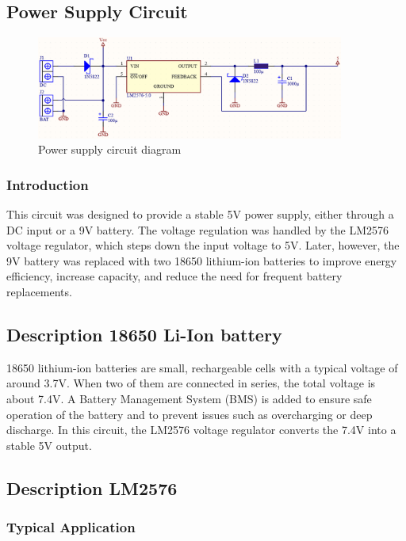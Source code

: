 \subsection{Power Supply Circuit}

\begin{figure}[h]
\centering
\includegraphics[width=0.9\textwidth]{assets/Power Supply}
\caption{Power supply circuit diagram}
\label{fig:power_circuit}
\end{figure}

\subsubsection*{Introduction}
This circuit was designed to provide a stable 5V power supply, either through a DC input or a 9V battery. The voltage regulation was handled by the LM2576 voltage regulator, which steps down the input voltage to 5V. Later, however, the 9V battery was replaced with two 18650 lithium-ion batteries to improve energy efficiency, increase capacity, and reduce the need for frequent battery replacements.

\subsection{Description 18650 Li-Ion battery}
18650 lithium-ion batteries are small, rechargeable cells with a typical voltage of around 3.7V. When two of them are connected in series, the total voltage is about 7.4V. A Battery Management System (BMS) is added to ensure safe operation of the battery and to prevent issues such as overcharging or deep discharge. In this circuit, the LM2576 voltage regulator converts the 7.4V into a stable 5V output.

\newpage

\subsection{Description LM2576}

\subsubsection{Typical Application}

